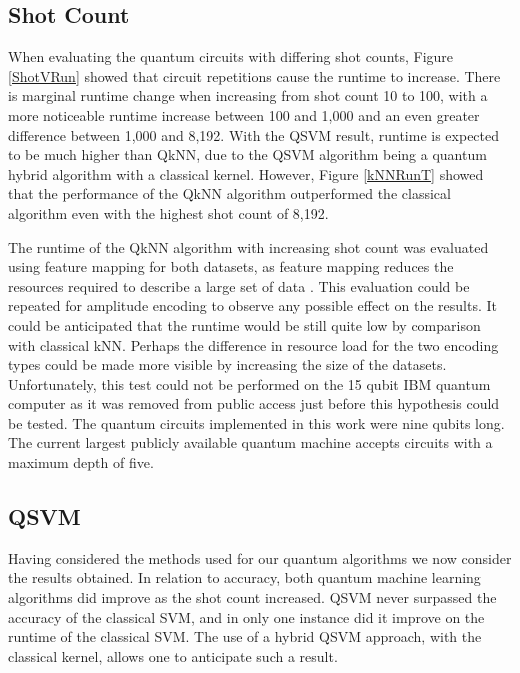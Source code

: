 \subsection{Shot Count}

When evaluating the quantum circuits with differing shot counts, Figure \ref{ShotVRun} showed that circuit repetitions cause the runtime to increase. There is marginal runtime change when increasing from shot count 10 to 100, with a more noticeable runtime increase between 100 and 1,000 and an even greater difference between 1,000 and 8,192. 
With the QSVM result, runtime is expected to be much higher than QkNN, due to the QSVM algorithm being a quantum hybrid algorithm with a classical kernel.
However, Figure \ref{kNNRunT} showed that the performance of the QkNN algorithm outperformed the classical algorithm even with the highest shot count of 8,192. 


The runtime of the QkNN algorithm with increasing shot count was evaluated using feature mapping for both datasets, as feature mapping reduces the resources required to describe a large set of data \citep{QiskitFMap}. This evaluation could be repeated for amplitude encoding to observe any possible effect on the results. It could be anticipated that the runtime would be still quite low by comparison with classical kNN. Perhaps the difference in resource load for the two encoding types could be made more visible by increasing the size of the datasets. Unfortunately, this test could not be performed on the 15 qubit IBM quantum computer as it was removed from public access just before this hypothesis could be tested. The quantum circuits implemented in this work were nine qubits long. The current largest publicly available quantum machine accepts circuits with a maximum depth of five. 


\subsection{QSVM}
Having considered the methods used for our quantum algorithms we now consider the results obtained. In relation to accuracy, both quantum machine learning algorithms did improve as the shot count increased. QSVM never surpassed the accuracy  of the classical SVM, and in only one instance did it improve on the runtime of the classical SVM. The use of a hybrid QSVM approach, with the classical kernel, allows one to anticipate such a result. 

